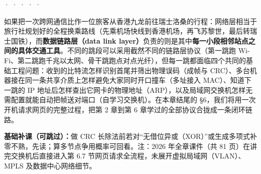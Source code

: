 

 ·  ·  ·  ·  · 


如果把一次跨网通信比作一位旅客从香港九龙前往瑞士洛桑的行程：网络层相当于旅行社规划好的全程换乘路线（先乘机场快线到香港机场，再飞苏黎世，最后转瑞士国铁），而\textbf{数据链路层（data link layer）}负责的则是其中\textbf{每一小段相邻站点之间的具体交通工具}。不同的跳段可以采用截然不同的链路层协议（第一跳跑 Wi-Fi、第二跳跑千兆以太网、骨干跳跑点对点光纤），但每一跳都面临四个共同的基础工程问题：收到的比特流怎样识别首尾并筛出物理误码（成帧与 CRC）、多台机器接在同一条共享介质上怎样避免大家同时开口撞车（多址接入 MAC）、知道下一跳的 IP 地址后怎样查出它网卡的物理地址（ARP），以及局域网交换机怎样无需配置就能自动把帧送对端口（自学习交换机）。在本章结尾的 §6，我们将用一次开机请求网页的完整过程，把第 2 章到第 6 章学过的全部协议合拢成一条闭环链路。

\textbf{基础补课（可跳过）：}做 CRC 长除法前若对“无借位异或（XOR）”或生成多项式补零不熟，先读；算多节点争用概率可回看。注：2026 年全章课件（共 81 页）在讲完交换机后直接进入第 6.7 节网页请求全流程，未展开虚拟局域网（VLAN）、MPLS 及数据中心网络细节。



